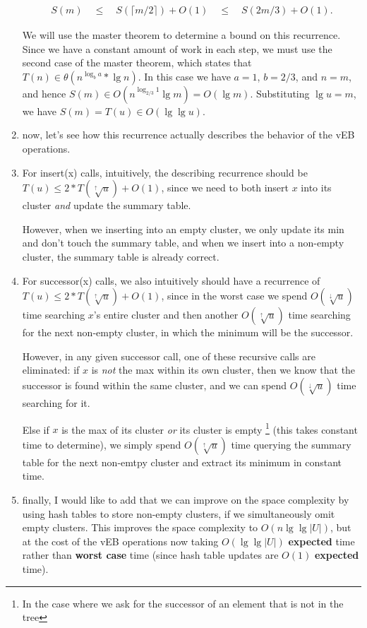 \begin{enumerate}
\begin{align}
  S(m) \quad\leq\quad S(\lceil m/2 \rceil) + O(1) \quad\leq\quad S(2m/3) + O(1).
\end{align}

    We will use the master theorem to determine a bound on this recurrence. 
    Since we have a constant amount of work in each step, we must use the second
    case of the master theorem, which states that $T(n) \in \theta(n^{\log_b a}
    * \lg n)$. In this case we have $a = 1$, $b = 2/3$, and $n = m$, and hence
    $S(m) \in O(n^{\log_{2/3} 1}\lg m) = O(\lg m)$. Substituting $\lg u = m$, we
    have $S(m) = T(u) \in O(\lg \lg u)$.

  \item now, let's see how this recurrence actually describes the behavior of
    the vEB operations.

  \item For insert(x) calls, intuitively, the describing recurrence should be
    $T(u) \leq 2 * T(\sqrt[\uparrow]{u}) + O(1)$, since we need to both insert
    $x$ into its cluster \emph{and} update the summary table.

    However, when we inserting into an empty cluster, we only update its min and
    don't touch the summary table, and when we insert into a non-empty cluster, the
    summary table is already correct.

  \item For successor(x) calls, we also intuitively should have a recurrence of
    $T(u) \leq 2 * T(\sqrt[\uparrow]{u}) + O(1)$, since in the worst case we
    spend $O(\sqrt[\downarrow]{u})$ time searching $x$'s entire cluster and then
    another $O(\sqrt[\uparrow]{u})$ time searching for the next non-empty cluster,
    in which the minimum will be the successor.

    However, in any given successor call, one of these recursive calls are
    eliminated: if $x$ is \emph{not} the max within its own cluster, then
    we know that the successor is found within the same cluster, and we can
    spend $O(\sqrt[\downarrow]{u})$ time searching for it.

    Else if $x$ is the max of its cluster \emph{or} its cluster is empty
    \footnote{In the case where we ask for the successor of an element that is
    not in the tree} (this takes constant time to determine), we simply spend
    $O(\sqrt[\uparrow]{u})$ time querying the summary table for the next
    non-emtpy cluster and extract its minimum in constant time.

  \item finally, I would like to add that we can improve on the space complexity
    by using hash tables to store non-empty clusters, if we simultaneously omit
    empty clusters. This improves the space complexity to $O(n \lg \lg |U|)$,
    but at the cost of the vEB operations now taking $O(\lg \lg |U|)$
    \textbf{expected} time rather than \textbf{worst case} time (since hash
    table updates are $O(1)$ \textbf{expected} time).

\end{enumerate}

